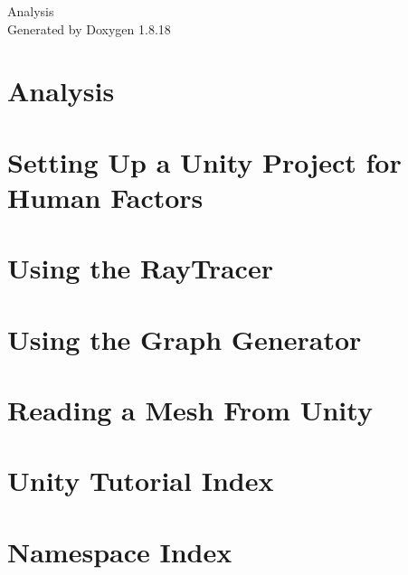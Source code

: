 \let\mypdfximage\pdfximage\def\pdfximage{\immediate\mypdfximage}\documentclass[twoside]{book}
\newcommand{\+}{\discretionary{\mbox{\scriptsize$\hookleftarrow$}}{}{}}
\newcommand{\clearemptydoublepage}{%
  \newpage{\pagestyle{empty}\cleardoublepage}%
}
\begin{document}
\hypersetup{pageanchor=false,
             bookmarksnumbered=true,
             pdfencoding=unicode
            }
\begin{titlepage}
\vspace*{7cm}
\begin{center}%
{\Large Analysis }\\
\vspace*{1cm}
{\large Generated by Doxygen 1.8.18}\\
\end{center}
\end{titlepage}
\clearemptydoublepage
{}
\tableofcontents
\clearemptydoublepage
{}
\hypersetup{pageanchor=true}

\chapter{Analysis}
\label{index}\hypertarget{index}{}
\chapter{Setting Up a Unity Project for Human Factors}
\label{_unity_project_setup}

\chapter{Using the Ray\+Tracer}
\label{_using_the_raytracer}

\chapter{Using the Graph Generator}
\label{_generating_a_graph}

\chapter{Reading a Mesh From Unity}
\label{_mesh_from_unity}

\chapter{Unity Tutorial Index}
\label{_unity_tutorials}

\chapter{Namespace Index}

\end{document}
